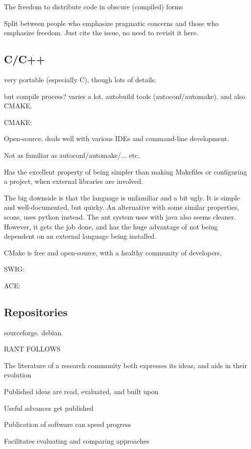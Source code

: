 The freedom to distribute code in obscure (compiled) forms



Split between people who emphasize pragmatic concerns and those
who emphasize freedom.  Just cite the issue, no need to revisit
it here.




\subsection{C/C++}

very portable (especially C), though lots of details.

but compile process?  varies a lot. autobuild tools
(autoconf/automake).  and also CMAKE.

CMAKE:

Open-source, deals well with various IDEs and command-line development.

Not as familiar as autoconf/automake/... etc.

Has the excellent property of being simpler than making Makefiles
or configuring a project, when external libraries are involved.

The big downside is that the language is unfamiliar and a bit ugly.
It is simple and well-documented, but quirky.  An alternative with
some similar properties, scons, uses python instead.  The ant system
uses with java also seems cleaner.  However, it gets the job
done, and has the huge advantage of not being dependent on an
external language being installed.

CMake is free and open-source, with a healthy community of 
developers.


SWIG:

ACE:


\subsection{Repositories}

sourceforge.  debian.

RANT FOLLOWS

The literature of a research community both expresses its ideas, and
aids in their evolution

Published ideas are read, evaluated, and built upon

Useful advances get published

Publication of software can speed progress

Facilitates evaluating and comparing approaches

